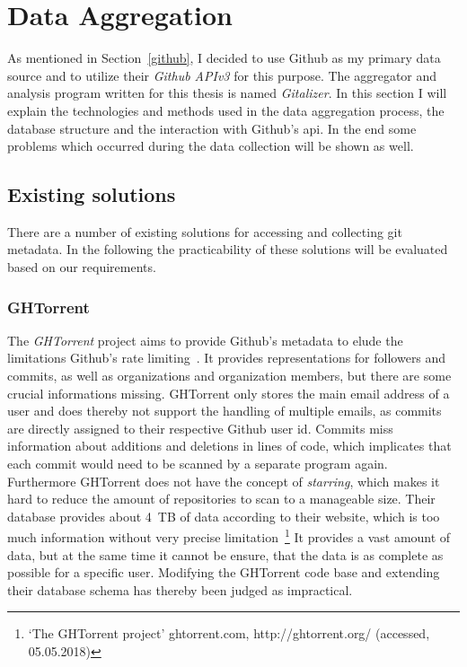 \section{Data Aggregation}\label{aggregator}
As mentioned in Section~\ref{github}, I decided to use Github as my primary data source and to utilize their \emph{Github APIv3} for this purpose.
The aggregator and analysis program written for this thesis is named \emph{Gitalizer}.
In this section I will explain the technologies and methods used in the data aggregation process, the database structure and the interaction with Github's \ac{api}.
In the end some problems which occurred during the data collection will be shown as well.


\subsection{Existing solutions}
There are a number of existing solutions for accessing and collecting git metadata.
In the following the practicability of these solutions will be evaluated based on our requirements.

\subsubsection{GHTorrent}
The \emph{GHTorrent} project aims to provide Github's metadata to elude the limitations Github's rate limiting~\cite{inproceedings:ghtorrent}.
It provides representations for followers and commits, as well as organizations and organization members, but there are some crucial informations missing.
GHTorrent only stores the main email address of a user and does thereby not support the handling of multiple emails, as commits are directly assigned to their respective Github user id.
Commits miss information about additions and deletions in lines of code, which implicates that each commit would need to be scanned by a separate program again.
Furthermore GHTorrent does not have the concept of \emph{starring}, which makes it hard to reduce the amount of repositories to scan to a manageable size.
Their database provides about 4~\ac{TB} of data according to their website, which is too much information without very precise limitation~\footnote{`The GHTorrent project' ghtorrent.com, http://ghtorrent.org/ (accessed, 05.05.2018)}
It provides a vast amount of data, but at the same time it cannot be ensure, that the data is as complete as possible for a specific user.
Modifying the GHTorrent code base and extending their database schema has thereby been judged as impractical.

